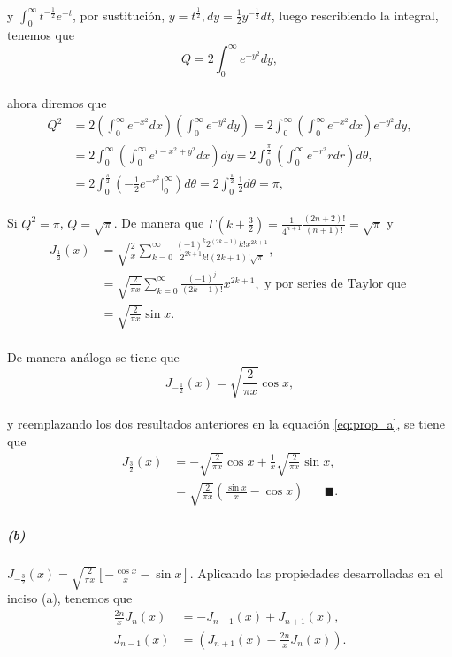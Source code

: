\documentclass{article}
\begin{document}
\paragraph{}y $\int_{0}^{\infty} t^{-\frac{1}{2}} e^{-t}$, por sustitución, $y = t^{\frac{1}{2}}, dy = \frac{1}{2} y^{-\frac{1}{2}}dt$, luego rescribiendo la integral, tenemos que
$$Q = 2 \int_{0}^{\infty} e^{-y^2} dy,$$
\paragraph{} ahora diremos que 
\begin{align*}
Q^2 &= 2\left(\int_{0}^{\infty} e^{-x^2} dx\right) \left(\int_{0}^{\infty} e^{-y^2} dy\right) = 2 \int_{0}^{\infty} \left(\int_{0}^{\infty}e^{-x^2} dx\right) e^{-y^2} dy,\\
&= 2 \int_{0}^{\infty} \left(\int_{0}^{\infty} e^{i-x^2 + y^2}dx\right)dy = 2 \int_{0}^{\frac{\pi}{2}} \left(\int_{0}^{\infty}e^{-r^2}r dr\right) d\theta,\\
&= 2 \int_{0}^{\frac{\pi}{2}} \left(-\frac{1}{2} e^{-r^2} \bigg|_{0}^{\infty}\right)d\theta = 2\int_{0}^{\frac{\pi}{2}} \frac{1}{2} d\theta = \pi,
\end{align*}
\paragraph{} Si $Q^2 = \pi$, $Q = \sqrt{\pi}$. De manera que $\Gamma(k + \frac{3}{2}) = \frac{1}{4^{n+1}} \frac{(2n+2)!}{(n+1)!} = \sqrt{\pi}$ y 
\begin{align*}
J_{\frac{1}{2}}(x) &= \sqrt{\frac{2}{x}} \sum_{k=0}^{\infty} \frac{(-1)^k 2^{(2k+1)}k! x^{2k+1}}{2^{2k+1}k!(2k+1)! \sqrt{\pi}},\\
&= \sqrt{\frac{2}{\pi x}} \sum_{k=0}^{\infty} \frac{(-1)^j}{(2k+1)!} x^{2k+1}, \text{ y por series de Taylor que }\\
&= \sqrt{\frac{2}{\pi x}} \sin{x}.
\end{align*}
\paragraph{} De manera análoga se tiene que
$$J_{-\frac{1}{2}}(x) = \sqrt{\frac{2}{\pi x}} \cos {x},$$
\paragraph{} y reemplazando los dos resultados anteriores en la equación \eqref{eq:prop_a}, se tiene que
\begin{align*}
J_{\frac{3}{2}}(x) &= - \sqrt{\frac{2}{\pi x}} \cos{x} + \frac{1}{x} \sqrt{\frac{2}{\pi x}} \sin{x},\\
&= \sqrt{\frac{2}{\pi x}}\left(\frac{\sin{x}}{x} - \cos {x}\right) \hspace{20pt} \blacksquare.
\end{align*}
\subparagraph{(b)} $J_{-\frac{3}{2}}(x) = \sqrt{\frac{2}{\pi x}} \left[-\frac{\cos{x}}{x} - \sin{x}\right]$. Aplicando las propiedades desarrolladas en el inciso (a), tenemos que
\begin{align*}
\frac{2n}{x} J_{n}(x) &= -J_{n-1}(x) + J_{n+1}(x),\\
J_{n-1}(x) &= \left(J_{n+1}(x) - \frac{2n}{x} J_n(x)\right).
\end{align*}
\end{document}
